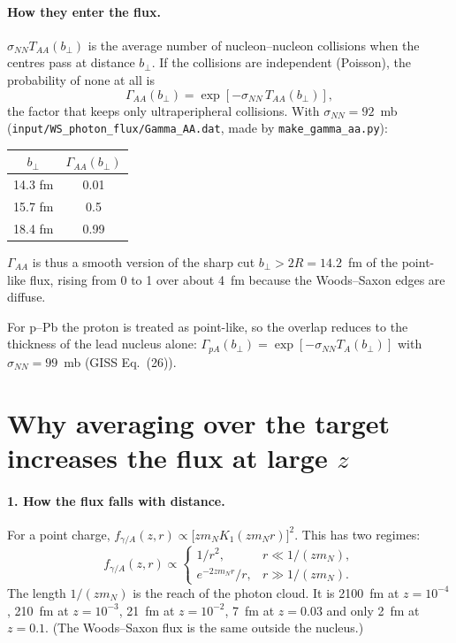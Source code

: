\documentclass[11pt]{article}
\begin{document}
\paragraph{How they enter the flux.} $\sigma_{NN}T_{AA}(b_\perp)$ is the average number of
nucleon--nucleon collisions when the centres pass at distance $b_\perp$. If the collisions are
independent (Poisson), the probability of none at all is
\begin{equation}
  \Gamma_{AA}(b_\perp)=\exp\!\left[-\sigma_{NN}\,T_{AA}(b_\perp)\right],
\end{equation}
the factor that keeps only ultraperipheral collisions. With $\sigma_{NN}=92$~mb
(\texttt{input/WS\_photon\_flux/Gamma\_AA.dat}, made by \texttt{make\_gamma\_aa.py}):
\begin{center}
\begin{tabular}{cc}
\toprule
$b_\perp$ & $\Gamma_{AA}(b_\perp)$ \\
\midrule
14.3 fm & 0.01 \\
15.7 fm & 0.5 \\
18.4 fm & 0.99 \\
\bottomrule
\end{tabular}
\end{center}
$\Gamma_{AA}$ is thus a smooth version of the sharp cut $b_\perp>2R=14.2$~fm of the point-like flux,
rising from 0 to 1 over about 4~fm because the Woods--Saxon edges are diffuse.

For p--Pb the proton is treated as point-like, so the overlap reduces to the thickness of the lead
nucleus alone: $\Gamma_{pA}(b_\perp)=\exp[-\sigma_{NN}T_A(b_\perp)]$ with $\sigma_{NN}=99$~mb (GISS
Eq.~(26)).

\section{Why averaging over the target increases the flux at large $z$}

\paragraph{1. How the flux falls with distance.} For a point charge,
$f_{\gamma/A}(z,r)\propto \big[z m_N K_1(z m_N r)\big]^2$. This has two regimes:
\begin{equation}
  f_{\gamma/A}(z,r)\propto
  \begin{cases}
    1/r^2, & r\ll 1/(zm_N),\\[2pt]
    e^{-2zm_N r}/r, & r\gg 1/(zm_N).
  \end{cases}
\end{equation}
The length $1/(zm_N)$ is the reach of the photon cloud. It is 2100~fm at $z=10^{-4}$, 210~fm at
$z=10^{-3}$, 21~fm at $z=10^{-2}$, 7~fm at $z=0.03$ and only 2~fm at $z=0.1$. (The Woods--Saxon
flux is the same outside the nucleus.)
\end{document}
